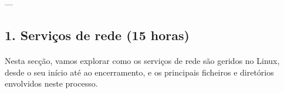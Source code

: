 \documentclass[10pt,a4paper]{article}
\begin{document}
	---
	
	\subsection*{1. Serviços de rede (15 horas)}
	\vspace{-1.2em}
	\paragraph{}
	Nesta secção, vamos explorar como os serviços de rede são geridos no Linux, desde o seu início até ao encerramento, e os principais ficheiros e diretórios envolvidos neste processo.
	
\end{document}
